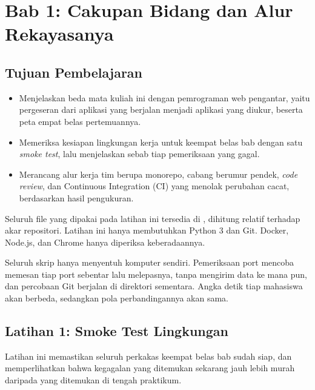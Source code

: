\section{Bab 1: Cakupan Bidang dan Alur Rekayasanya}

\subsection*{Tujuan Pembelajaran}
\begin{itemize}
  \item Menjelaskan beda mata kuliah ini dengan pemrograman web pengantar,
        yaitu pergeseran dari aplikasi yang berjalan menjadi aplikasi yang
        diukur, beserta peta empat belas pertemuannya.
  \item Memeriksa kesiapan lingkungan kerja untuk keempat belas bab dengan
        satu \textit{smoke test}, lalu menjelaskan sebab tiap pemeriksaan yang
        gagal.
  \item Merancang alur kerja tim berupa monorepo, cabang berumur pendek,
        \textit{code review}, dan Continuous Integration (CI) yang menolak
        perubahan cacat, berdasarkan hasil pengukuran.
\end{itemize}

Seluruh file yang dipakai pada latihan ini tersedia di
, dihitung relatif terhadap akar repositori.
Latihan ini hanya membutuhkan Python 3 dan Git. Docker, Node.js, dan Chrome
hanya diperiksa keberadaannya.

Seluruh skrip hanya menyentuh komputer sendiri. Pemeriksaan port mencoba
memesan tiap port sebentar lalu melepasnya, tanpa mengirim data ke mana pun,
dan percobaan Git berjalan di direktori sementara. Angka detik tiap mahasiswa
akan berbeda, sedangkan pola perbandingannya akan sama.

\subsection*{Latihan 1: Smoke Test Lingkungan}

Latihan ini memastikan seluruh perkakas keempat belas bab sudah siap, dan
memperlihatkan bahwa kegagalan yang ditemukan sekarang jauh lebih murah
daripada yang ditemukan di tengah praktikum.

